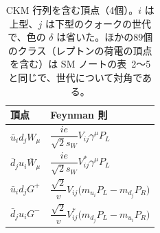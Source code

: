 \documentclass[a4paper,10pt]{ltjsarticle}
\newcommand{\sw}{s_W}
\begin{document}
\begin{table}[tbp]
\centering\small\renewcommand{\arraystretch}{1.75}
\caption{CKM 行列を含む頂点（4個）。$i$ は上型、$j$ は下型のクォークの世代で、色の $\delta$ は省いた。ほかの89個のクラス（レプトンの荷電の頂点を含む）は SM ノートの表~2〜5 と同じで、世代について対角である。}
\label{tab:rules-ckm}
\begin{tabular}{ll}
\toprule
頂点 & Feynman 則 \\
\midrule
$\bar u_id_jW_\mu$ & $\dfrac{ie}{\sqrt2\sw}V_{ij}\gamma^\mu P_L$ \\
$\bar d_ju_i\bar W_\mu$ & $\dfrac{ie}{\sqrt2\sw}V_{ij}^*\gamma^\mu P_L$ \\
$\bar u_id_jG^+$ & $\dfrac{\sqrt2}{v}V_{ij}\bigl(m_{u_i}P_L-m_{d_j}P_R\bigr)$ \\
$\bar d_ju_iG^-$ & $\dfrac{\sqrt2}{v}V_{ij}^*\bigl(m_{d_j}P_L-m_{u_i}P_R\bigr)$ \\
\bottomrule
\end{tabular}
\end{table}
\end{document}
